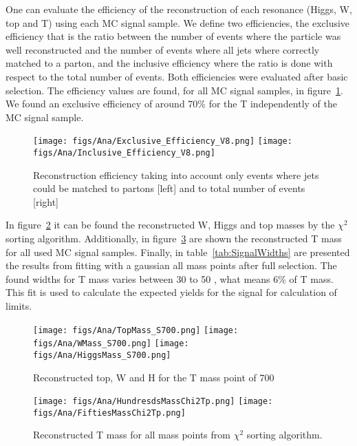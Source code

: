 One can evaluate the efficiency of the reconstruction of each resonance (Higgs, W, top and T) using each MC signal sample. We define two efficiencies, the exclusive efficiency that is the ratio between the number of events where the particle was well reconstructed and the number of events where all jets where correctly matched to a parton, and the inclusive efficiency where the ratio is done with respect to the total number of events. Both efficiencies were evaluated after basic selection. The efficiency values are found, for all MC signal samples, in figure~\ref{fig:RecEff}. We found an exclusive efficiency of around 70\% for the T independently of the MC signal sample.

\begin{figure}[!Hhtbp]
  \begin{center}
    \texttt{[image: figs/Ana/Exclusive\_Efficiency\_V8.png]}
    \texttt{[image: figs/Ana/Inclusive\_Efficiency\_V8.png]}
    \caption{Reconstruction efficiency taking into account only events where jets could be matched to partons [left] and to total number of events [right]}
    \label{fig:RecEff}
  \end{center}
\end{figure}

In figure~\ref{fig:WHt} it can be found the reconstructed W, Higgs and top masses by the $\chi^{2}$ sorting algorithm. Additionally, in figure~\ref{fig:RecT} are shown the reconstructed T mass for all used MC signal samples. Finally, in table~\ref{tab:SignalWidths} are presented the results from fitting with a gaussian all mass points after full selection. The found widths for T mass varies between 30 to 50 \GeVcc, what means 6\% of T mass. This fit is used to calculate the expected yields for the signal for calculation of limits.

\begin{figure}[!Hhtbp]
  \begin{center}
    \texttt{[image: figs/Ana/TopMass\_S700.png]}
    \texttt{[image: figs/Ana/WMass\_S700.png]}
    \texttt{[image: figs/Ana/HiggsMass\_S700.png]}
    \caption{Reconstructed top, W and H for the T mass point of 700 \GeVcc}
    \label{fig:WHt}
  \end{center}
\end{figure}

\begin{figure}[!Hhtbp]
  \begin{center}
    \texttt{[image: figs/Ana/HundresdsMassChi2Tp.png]}
    \texttt{[image: figs/Ana/FiftiesMassChi2Tp.png]}
    \caption{Reconstructed T mass for all mass points from $\chi^{2}$ sorting algorithm.}
    \label{fig:RecT}
  \end{center}
\end{figure}

